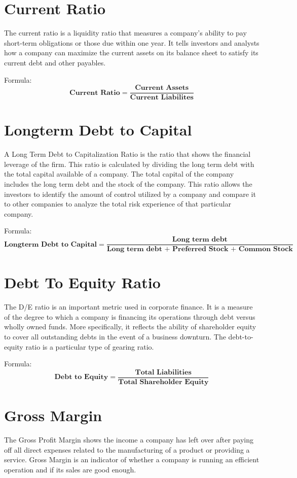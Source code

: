 \documentclass{article}
\begin{document}
\section{Current Ratio}
\label{sec:currentRatio}

The current ratio is a liquidity ratio that measures a company's ability to pay short-term obligations or those due within one year. It tells investors and analysts how a company can maximize the current assets on its balance sheet to satisfy its current debt and other payables. 
\bigskip

Formula:
$$
\textbf{Current Ratio} =  \frac{\textbf{Current Assets}}{\textbf{Current Liabilites}}
$$


\bigskip
\section{Longterm Debt to Capital}
\label{sec:ldtc}
A Long Term Debt to Capitalization Ratio is the ratio that shows the financial leverage of the firm. This ratio is calculated by dividing the long term debt with the total capital available of a company. The total capital of the company includes the long term debt and the stock of the company. This ratio allows the investors to identify the amount of control utilized by a company and compare it to other companies to analyze the total risk experience of that particular company.
\bigskip

Formula:
$$
\textbf{Longterm Debt to Capital} =  \frac{\textbf{Long term debt}}{\textbf{Long term debt + Preferred Stock + Common Stock}}
$$

\section{Debt To Equity Ratio}
\label{sec:dter}
The D/E ratio is an important metric used in corporate finance. It is a measure of the degree to which a company is financing its operations through debt versus wholly owned funds. More specifically, it reflects the ability of shareholder equity to cover all outstanding debts in the event of a business downturn. The debt-to-equity ratio is a particular type of gearing ratio. 

\bigskip
Formula:
$$
\textbf{Debt to Equity} =  \frac{\textbf{Total Liabilities}}{\textbf{Total Shareholder Equity}}
$$

\section{Gross Margin}
\label{sec:GM}
The Gross Profit Margin shows the income a company has left over after paying off all direct expenses related to the manufacturing of a product or providing a service. Gross Margin is an indicator of whether a company is running an efficient operation and if its sales are good enough.
\end{document}
